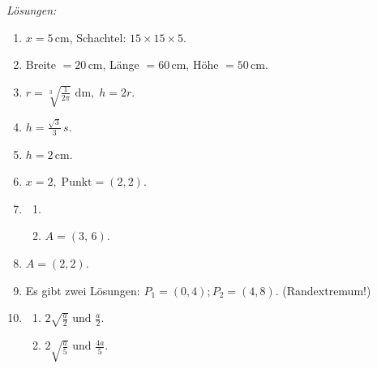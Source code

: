 \pagebreak
\emph{Lösungen:}

\begin{enumerate}
	\item \(x = 5\,\text{cm}\), Schachtel: \(15 \times 15 \times 5\).
	\item Breite \(= 20\,\text{cm}\), Länge \(= 60\,\text{cm}\), Höhe \(= 50\,\text{cm}\).
	\item \(r = \sqrt[3]{\tfrac{1}{2\pi}} \text{ dm},\; h = 2r\).
	\item \(h = \tfrac{\sqrt{3}}{3}\,s\).
	\item \(h = 2\,\text{cm}\).
	\item \(x = 2,\; \text{Punkt} = (2,2)\).
	\item
	      \begin{enumerate}
		      \item %
		      \item \(A = \left(3,\, 6\right)\).
	      \end{enumerate}
	\item \(A = \left(2, 2\right)\).
	\item Es gibt zwei Lösungen: $P_1 = (0, 4); P_2=(4, 8)$. (Randextremum!)
	\item
	      \begin{enumerate}
		      \item \(2\sqrt{\frac{a}{2}}\text{ und } \frac{a}{2}\).
		      \item \(2\sqrt{\frac{a}{5}}\text{ und } \frac{4a}{5}\).
	      \end{enumerate}
\end{enumerate}

































